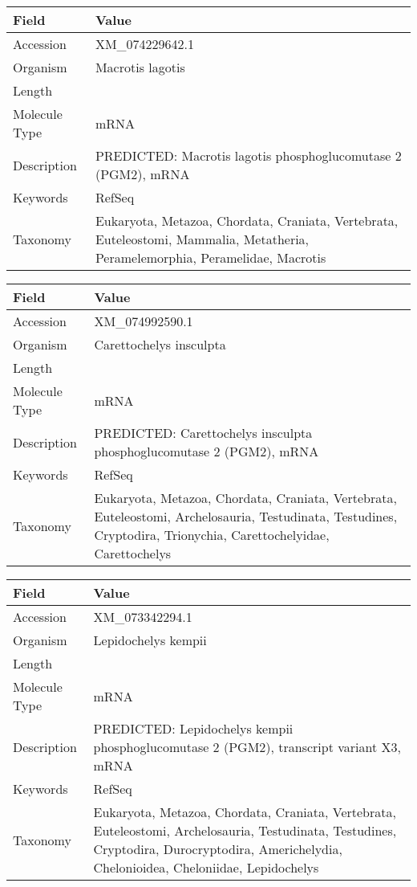 \documentclass[10pt]{article}
\begin{document}
\vspace{1em}
{\footnotesize
\begin{longtable}{>{\raggedright\arraybackslash}p{4.5cm} >{\raggedright\arraybackslash}p{11.5cm}}
\textbf{Field} & \textbf{Value} \\
\hline
Accession & XM\_074229642.1 \\
Organism & Macrotis lagotis \\
Length & 3649 \\
Molecule Type & mRNA \\
Description & PREDICTED: Macrotis lagotis phosphoglucomutase 2 (PGM2), mRNA \\
Keywords & RefSeq \\
Taxonomy & Eukaryota, Metazoa, Chordata, Craniata, Vertebrata, Euteleostomi, Mammalia, Metatheria, Peramelemorphia, Peramelidae, Macrotis \\
\end{longtable}
}

\vspace{1em}
{\footnotesize
\begin{longtable}{>{\raggedright\arraybackslash}p{4.5cm} >{\raggedright\arraybackslash}p{11.5cm}}
\textbf{Field} & \textbf{Value} \\
\hline
Accession & XM\_074992590.1 \\
Organism & Carettochelys insculpta \\
Length & 12252 \\
Molecule Type & mRNA \\
Description & PREDICTED: Carettochelys insculpta phosphoglucomutase 2 (PGM2), mRNA \\
Keywords & RefSeq \\
Taxonomy & Eukaryota, Metazoa, Chordata, Craniata, Vertebrata, Euteleostomi, Archelosauria, Testudinata, Testudines, Cryptodira, Trionychia, Carettochelyidae, Carettochelys \\
\end{longtable}
}

\vspace{1em}
{\footnotesize
\begin{longtable}{>{\raggedright\arraybackslash}p{4.5cm} >{\raggedright\arraybackslash}p{11.5cm}}
\textbf{Field} & \textbf{Value} \\
\hline
Accession & XM\_073342294.1 \\
Organism & Lepidochelys kempii \\
Length & 4197 \\
Molecule Type & mRNA \\
Description & PREDICTED: Lepidochelys kempii phosphoglucomutase 2 (PGM2), transcript variant X3, mRNA \\
Keywords & RefSeq \\
Taxonomy & Eukaryota, Metazoa, Chordata, Craniata, Vertebrata, Euteleostomi, Archelosauria, Testudinata, Testudines, Cryptodira, Durocryptodira, Americhelydia, Chelonioidea, Cheloniidae, Lepidochelys \\
\end{longtable}
}
\end{document}
